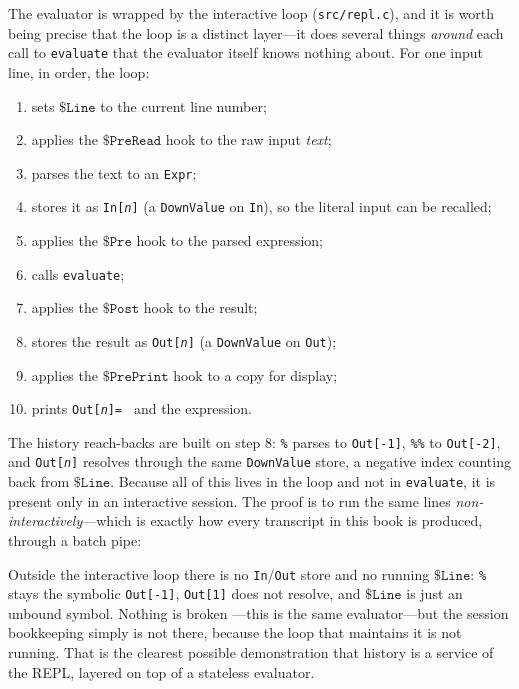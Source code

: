 The evaluator is wrapped by the interactive loop (\texttt{src/repl.c}), and it is
worth being precise that the loop is a distinct layer---it does several things
\emph{around} each call to \texttt{evaluate} that the evaluator itself knows nothing
about. For one input line, in order, the loop:

\begin{enumerate}
  \item sets \(\mathtt{\$Line}\) to the current line number;
  \item applies the \(\mathtt{\$PreRead}\) hook to the raw input \emph{text};
  \item parses the text to an \texttt{Expr};
  \item stores it as \texttt{In[\textit{n}]} (a \texttt{DownValue} on \texttt{In}), so
        the literal input can be recalled;
  \item applies the \(\mathtt{\$Pre}\) hook to the parsed expression;
  \item calls \texttt{evaluate};
  \item applies the \(\mathtt{\$Post}\) hook to the result;
  \item stores the result as \texttt{Out[\textit{n}]} (a \texttt{DownValue} on
        \texttt{Out});
  \item applies the \(\mathtt{\$PrePrint}\) hook to a copy for display;
  \item prints \texttt{Out[\textit{n}]= } and the expression.
\end{enumerate}

The history reach-backs are built on step 8: \texttt{\%} parses to
\texttt{Out[-1]}, \texttt{\%\%} to \texttt{Out[-2]}, and \texttt{Out[\textit{n}]}
resolves through the same \texttt{DownValue} store, a negative index counting back from
\(\mathtt{\$Line}\). Because all of this lives in the loop and not in \texttt{evaluate},
it is present only in an interactive session. The proof is to run the same lines
\emph{non-interactively}---which is exactly how every transcript in this book is
produced, through a batch pipe:


Outside the interactive loop there is no \texttt{In}/\texttt{Out} store and no running
\(\mathtt{\$Line}\): \texttt{\%} stays the symbolic \texttt{Out[-1]}, \texttt{Out[1]}
does not resolve, and \(\mathtt{\$Line}\) is just an unbound symbol. Nothing is broken
---this is the same evaluator---but the session bookkeeping simply is not there,
because the loop that maintains it is not running. That is the clearest possible
demonstration that history is a service of the REPL, layered on top of a stateless
evaluator.

